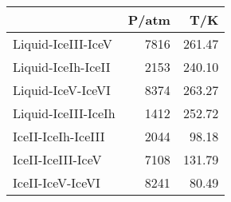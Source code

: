 \begin{tabular}{lrr}
\hline\hline
&P/atm&T/K\\
\hline
Liquid-IceIII-IceV&7816&261.47\\
Liquid-IceIh-IceII&2153&240.10\\
Liquid-IceV-IceVI&8374&263.27\\
Liquid-IceIII-IceIh&1412&252.72\\
IceII-IceIh-IceIII&2044&98.18\\
IceII-IceIII-IceV&7108&131.79\\
IceII-IceV-IceVI&8241&80.49\\
\hline\hline
\end{tabular}